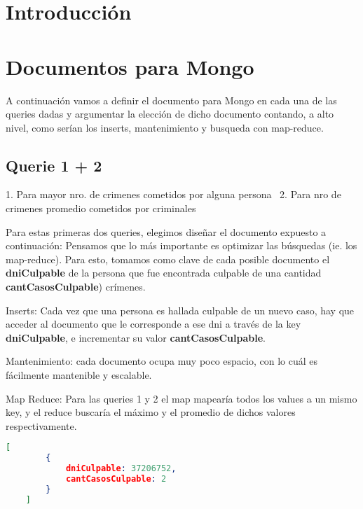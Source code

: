 \documentclass[11pt, a4paper]{article}
\begin{document}

\maketitle
\newpage

\tableofcontents
\newpage

%
\section{Introducción}

\section{Documentos para Mongo}

A continuaci\'on vamos a definir el documento para Mongo en cada una de las queries dadas y argumentar la elecci\'on de dicho documento contando, a alto nivel, como ser\'ian los inserts, mantenimiento y busqueda con map-reduce.

\subsection{Querie 1 + 2}
1. Para mayor nro. de crimenes cometidos por alguna persona \
2. Para nro de crimenes promedio cometidos por criminales \

Para estas primeras dos queries, elegimos diseñar el documento expuesto a continuación: Pensamos que lo más importante es optimizar las búsquedas (ie. los map-reduce).
Para esto, tomamos como clave de cada posible documento el \textbf{dniCulpable} de la persona que fue encontrada culpable de una cantidad \textbf{cantCasosCulpable}) crímenes. \

Inserts: Cada vez que una persona es hallada culpable de un nuevo caso, hay que acceder al documento que le corresponde a ese dni a través de la key \textbf{dniCulpable}, e incrementar su valor \textbf{cantCasosCulpable}. \

Mantenimiento: cada documento ocupa muy poco espacio, con lo cuál es fácilmente mantenible y escalable.\

Map Reduce: Para las queries 1 y 2 el map mapearía todos los values a un mismo key, y el reduce buscaría el máximo y el promedio de dichos valores respectivamente. \

\begin{lstlisting}[language=json]
	[
		{
			dniCulpable: 37206752,
			cantCasosCulpable: 2
		}
	]
\end{lstlisting}
\end{document}

